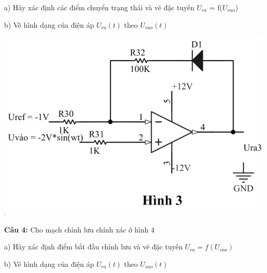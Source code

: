 \documentclass[10pt,a4paper]{article}
\begin{document}
		a) Hãy xác định các điểm chuyển trạng thái và vẽ đặc tuyến $U_{ra}$ = f($U_{vao}$)
		
		b) Vẽ hình dạng của điện áp $U_{ra}(t)$ theo $U_{vao}(t)$
		\begin{center}
			\includegraphics[width=0.9\linewidth]{screenshot003}
		\end{center}
		\vspace{1cm}
		\begin{flushleft}	
			\color{red}\textbf{Câu 4: }\color{black} Cho mạch chỉnh lưu chính xác ở hình 4
		\end{flushleft}
		
		a) Hãy xác định điểm bắt đầu chỉnh lưu và vẽ đặc tuyến $U_{ra} = f(U_{vao})$
		
		b) Vẽ hình dạng của điện áp $U_{ra}(t)$ theo $U_{vao}(t)$
		
\end{document}
